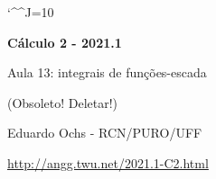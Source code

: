 \documentclass[oneside,12pt]{article}
\begin{document}
\catcode`\^^J=10

\pu

%
%

\def\drafturl{http://angg.twu.net/LATEX/2021-1-C2.pdf}
\def\drafturl{http://angg.twu.net/2021.1-C2.html}
\def\draftfooter{\tiny \href{\drafturl}{\jobname{}} \ColorBrown{\shorttoday{} \hours}}



%

\thispagestyle{empty}

\begin{center}

\vspace*{1.2cm}

{\bf \Large Cálculo 2 - 2021.1}

\bsk

Aula 13: integrais de funções-escada

(Obsoleto! Deletar!)

\bsk

Eduardo Ochs - RCN/PURO/UFF

\url{http://angg.twu.net/2021.1-C2.html}

\end{center}
\end{document}
